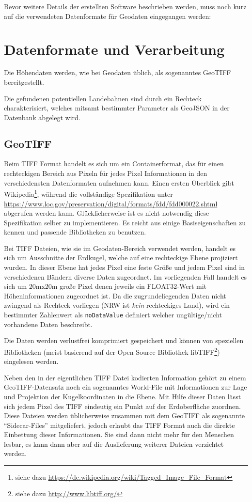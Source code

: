 \documentclass[10pt,a4paper]{report}
\newcommand*{\skippingparagraph}{\par\vspace{1.0\baselineskip}\noindent}
\begin{document}
\skippingparagraph
Bevor weitere Details der erstellten Software beschrieben werden, muss noch kurz auf die verwendeten Datenformate für Geodaten eingegangen werden:

\section{Datenformate und Verarbeitung}
Die Höhendaten werden, wie bei Geodaten üblich, als sogenanntes GeoTIFF bereitgestellt. 

Die gefundenen potentiellen Landebahnen sind durch ein Rechteck charakterisiert, welches mitsamt bestimmter Parameter als GeoJSON in der Datenbank abgelegt wird.

\subsection{GeoTIFF}
Beim TIFF Format handelt es sich um ein Containerformat, das für einen rechteckigen Bereich aus Pixeln für jedes Pixel Informationen in den verschiedensten Datenformaten aufnehmen kann. Einen ersten Überblick gibt Wikipedia\footnote{siehe dazu \url{https://de.wikipedia.org/wiki/Tagged_Image_File_Format}}, während die vollständige Spezifikation unter \url{https://www.loc.gov/preservation/digital/formats/fdd/fdd000022.shtml} abgerufen werden kann. Glücklicherweise ist es nicht notwendig diese Spezifikation selber zu implementieren. Es reicht aus einige Basiseigenschaften zu kennen und passende Bibliotheken zu benutzen.

Bei TIFF Dateien, wie sie im Geodaten-Bereich verwendet werden, handelt es sich um Ausschnitte der Erdkugel, welche auf eine rechteckige Ebene projiziert wurden. In dieser Ebene hat jedes Pixel eine feste Größe und jedem Pixel sind in verschiedenen Bändern diverse Daten zugeordnet. Im vorliegenden Fall handelt es sich um 20mx20m große Pixel denen jeweils ein FLOAT32-Wert mit Höheninformationen zugeordnet ist.
Da die zugrundeliegenden Daten nicht zwingend als Rechteck vorliegen (NRW ist \emph{kein} rechteckiges Land), wird ein bestimmter Zahlenwert als \verb|noDataValue| definiert welcher ungültige/nicht vorhandene Daten beschreibt.

Die Daten werden verlustfrei komprimiert gespeichert und können von speziellen Bibliotheken (meist basierend auf der Open-Source Bibliothek libTIFF\footnote{siehe dazu \url{http://www.libtiff.org/}}) eingelesen werden.

Neben den in der eigentlichen TIFF Datei kodierten Information gehört zu einem GeoTIFF-Datensatz noch ein sogenanntes World-File mit Informationen zur Lage und Projektion der Kugelkoordinaten in die Ebene. Mit Hilfe dieser Daten lässt sich jedem Pixel des TIFF eindeutig ein Punkt auf der Erdoberfläche zuordnen. Diese Dateien werden üblicherweise zusammen mit dem GeoTIFF als sogenannte "`Sidecar-Files"' mitgeliefert, jedoch erlaubt das TIFF Format auch die direkte Einbettung dieser Informationen. Sie sind dann nicht mehr für den Menschen lesbar, es kann dann aber auf die Auslieferung weiterer Dateien verzichtet werden. 
\end{document}
